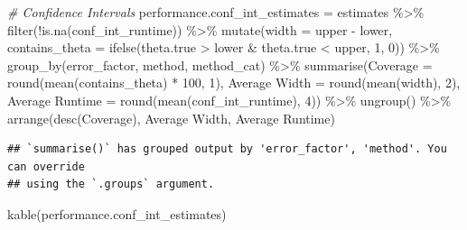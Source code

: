 \documentclass[
]{article}
\newenvironment{Shaded}{\begin{snugshade}}{\end{snugshade}}
\newcommand{\AttributeTok}[1]{\textcolor[rgb]{0.77,0.63,0.00}{#1}}
\newcommand{\CommentTok}[1]{\textcolor[rgb]{0.56,0.35,0.01}{\textit{#1}}}
\newcommand{\DecValTok}[1]{\textcolor[rgb]{0.00,0.00,0.81}{#1}}
\newcommand{\FunctionTok}[1]{\textcolor[rgb]{0.00,0.00,0.00}{#1}}
\newcommand{\NormalTok}[1]{#1}
\newcommand{\OtherTok}[1]{\textcolor[rgb]{0.56,0.35,0.01}{#1}}
\newcommand{\SpecialCharTok}[1]{\textcolor[rgb]{0.00,0.00,0.00}{#1}}
\newcommand{\StringTok}[1]{\textcolor[rgb]{0.31,0.60,0.02}{#1}}
\begin{document}
\begin{Shaded}
\begin{Highlighting}[]
\CommentTok{\# Confidence Intervals}
\NormalTok{performance.conf\_int\_estimates }\OtherTok{=}\NormalTok{ estimates }\SpecialCharTok{\%\textgreater{}\%}
  \FunctionTok{filter}\NormalTok{(}\SpecialCharTok{!}\FunctionTok{is.na}\NormalTok{(conf\_int\_runtime)) }\SpecialCharTok{\%\textgreater{}\%}
  \FunctionTok{mutate}\NormalTok{(}\AttributeTok{width =}\NormalTok{ upper }\SpecialCharTok{{-}}\NormalTok{ lower,}
         \AttributeTok{contains\_theta =} \FunctionTok{ifelse}\NormalTok{(theta.true }\SpecialCharTok{\textgreater{}}\NormalTok{ lower }\SpecialCharTok{\&}\NormalTok{ theta.true }\SpecialCharTok{\textless{}}\NormalTok{ upper, }\DecValTok{1}\NormalTok{, }\DecValTok{0}\NormalTok{)) }\SpecialCharTok{\%\textgreater{}\%}
  \FunctionTok{group\_by}\NormalTok{(error\_factor, method, method\_cat) }\SpecialCharTok{\%\textgreater{}\%}
  \FunctionTok{summarise}\NormalTok{(}\AttributeTok{Coverage =} \FunctionTok{round}\NormalTok{(}\FunctionTok{mean}\NormalTok{(contains\_theta) }\SpecialCharTok{*} \DecValTok{100}\NormalTok{, }\DecValTok{1}\NormalTok{),}
            \StringTok{\textasciigrave{}}\AttributeTok{Average Width}\StringTok{\textasciigrave{}} \OtherTok{=} \FunctionTok{round}\NormalTok{(}\FunctionTok{mean}\NormalTok{(width), }\DecValTok{2}\NormalTok{),}
            \StringTok{\textasciigrave{}}\AttributeTok{Average Runtime}\StringTok{\textasciigrave{}} \OtherTok{=} \FunctionTok{round}\NormalTok{(}\FunctionTok{mean}\NormalTok{(conf\_int\_runtime), }\DecValTok{4}\NormalTok{)) }\SpecialCharTok{\%\textgreater{}\%}
  \FunctionTok{ungroup}\NormalTok{() }\SpecialCharTok{\%\textgreater{}\%}
  \FunctionTok{arrange}\NormalTok{(}\FunctionTok{desc}\NormalTok{(Coverage), }\StringTok{\textasciigrave{}}\AttributeTok{Average Width}\StringTok{\textasciigrave{}}\NormalTok{, }\StringTok{\textasciigrave{}}\AttributeTok{Average Runtime}\StringTok{\textasciigrave{}}\NormalTok{)}
\end{Highlighting}
\end{Shaded}

\begin{verbatim}
## `summarise()` has grouped output by 'error_factor', 'method'. You can override
## using the `.groups` argument.
\end{verbatim}

\begin{Shaded}
\begin{Highlighting}[]
\FunctionTok{kable}\NormalTok{(performance.conf\_int\_estimates)}
\end{Highlighting}
\end{Shaded}
\end{document}
